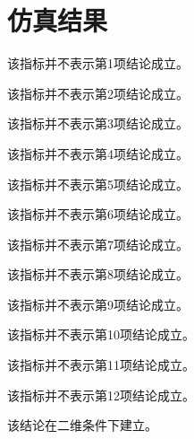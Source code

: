 \section{仿真结果}
该指标并不表示第1项结论成立。

该指标并不表示第2项结论成立。

该指标并不表示第3项结论成立。

该指标并不表示第4项结论成立。

该指标并不表示第5项结论成立。

该指标并不表示第6项结论成立。

该指标并不表示第7项结论成立。

该指标并不表示第8项结论成立。

该指标并不表示第9项结论成立。

该指标并不表示第10项结论成立。

该指标并不表示第11项结论成立。

该指标并不表示第12项结论成立。

该结论在二维条件下建立。
